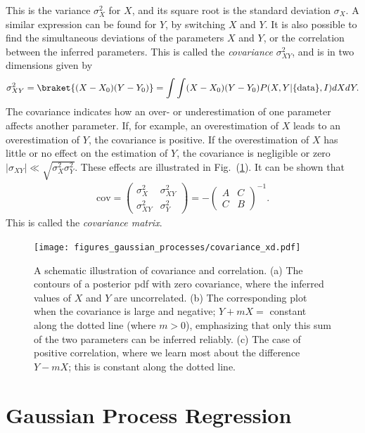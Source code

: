\documentclass[twoside,english]{uiofysmaster}
\begin{document}
This is the variance $\sigma_X^2$ for $X$, and its square root is the standard deviation $\sigma_X$. A similar expression can be found for $Y$, by switching $X$ and $Y$. It is also possible to find the simultaneous deviations of the parameters $X$ and $Y$, or the correlation between the inferred parameters. This is called the \textit{covariance} $\sigma_{XY}^2$, and is in two dimensions given by
\begin{align}
\sigma_{XY}^2 = \braket{(X - X_0) (Y - Y_0)} =\int \int (X - X_0) (Y - Y_0) P (X, Y | \{\text{data}\}, I) dXdY.
\end{align}
The covariance indicates how an over- or underestimation of one parameter affects another parameter. If, for example, an overestimation of $X$ leads to an overestimation of $Y$, the covariance is positive. If the overestimation of $X$ has little or no effect on the estimation of $Y$, the covariance is negligible or zero $|\sigma_{XY}| \ll \sqrt{\sigma_X^2 \sigma_Y^2}$. These effects are illustrated in Fig.\ (\ref{Fig:: gaussian process : Covariance illustrated}). It can be shown that \cite{sivia2006data}
\begin{align}
\text{cov} = 
\begin{pmatrix}
\sigma_X^2 & \sigma_{XY}^2\\
\sigma_{XY}^2 & \sigma_Y^2
\end{pmatrix}
= - \begin{pmatrix}
A & C\\
C & B
\end{pmatrix}^{-1}.
\end{align}
This is called the \textit{covariance matrix}.

\begin{figure}
\centering
\texttt{[image: figures\_gaussian\_processes/covariance\_xd.pdf]}
\caption{A schematic illustration of covariance and correlation. (a) The contours of a posterior pdf with zero covariance, where the inferred values of $X$ and $Y$ are uncorrelated. (b) The corresponding plot when the covariance is large and negative; $Y + mX =$ constant along the dotted line (where $m > 0$), emphasizing that only this sum of the two parameters can be inferred reliably. (c) The case of positive correlation, where we learn most about the difference $Y − mX$; this is constant along the dotted line.}
\label{Fig:: gaussian process : Covariance illustrated}
\end{figure}


\section{Gaussian Process Regression}
\end{document}
